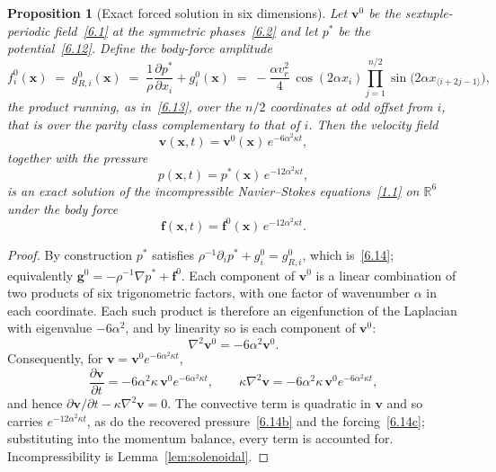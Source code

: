 \documentclass[11pt]{jfm}
\newtheorem{proposition}[lemma]{Proposition}
\numberwithin{equation}{section}
\begin{document}
\begin{proposition}[Exact forced solution in six dimensions]
\label{prop:6D-forced}
Let $\boldsymbol{v}^0$ be the sextuple-periodic field~\eqref{6.1} at the symmetric
phases~\eqref{6.2} and let $p^{*}$ be the potential~\eqref{6.12}. Define the body-force amplitude
\begin{equation}
\label{6.14}
f_i^0(\boldsymbol{x}) \;=\; g_{R,i}^{0}(\boldsymbol{x})
\;=\; \frac{1}{\rho}\frac{\partial p^{*}}{\partial x_i}+ g_i^0(\boldsymbol{x})
\;=\; -\frac{\alpha v_r^2}{4}\,\cos(2\alpha x_i)
\prod_{j=1}^{n/2}\sin\!\bigl(2\alpha x_{\langle i+2j-1\rangle}\bigr),
\end{equation}
the product running, as in~\eqref{6.13}, over the $n/2$ coordinates at odd offset from $i$,
that is over the parity class complementary to that of $i$. Then the velocity field
\begin{equation}
\label{6.14a}
\boldsymbol{v}(\boldsymbol{x},t)=\boldsymbol{v}^0(\boldsymbol{x})\,e^{-6\alpha^2\kappa t},
\end{equation}
together with the pressure
\begin{equation}
\label{6.14b}
p(\boldsymbol{x},t)=p^{*}(\boldsymbol{x})\,e^{-12\alpha^2\kappa t},
\end{equation}
is an exact solution of the incompressible Navier--Stokes equations~\eqref{1.1} on $\mathbb{R}^6$
under the body force
\begin{equation}
\label{6.14c}
\boldsymbol{f}(\boldsymbol{x},t)=\boldsymbol{f}^0(\boldsymbol{x})\,e^{-12\alpha^2\kappa t}.
\end{equation}
\end{proposition}

\begin{proof}
By construction $p^{*}$ satisfies $\rho^{-1}\partial_i p^{*}+ g_i^0= g_{R,i}^{0}$, which
is~\eqref{6.14}; equivalently $\boldsymbol{g}^0=-\rho^{-1}\nabla p^{*}+\boldsymbol{f}^0$. Each
component of $\boldsymbol{v}^0$ is a linear combination of two products of six trigonometric
factors, with one factor of wavenumber $\alpha$ in each coordinate. Each such product is therefore
an eigenfunction of the Laplacian with eigenvalue $-6\alpha^2$, and by linearity so is each
component of $\boldsymbol{v}^0$:
\[
\nabla^2\boldsymbol{v}^0=-6\alpha^2\boldsymbol{v}^0 .
\]
Consequently, for $\boldsymbol{v}=\boldsymbol{v}^0e^{-6\alpha^2\kappa t}$,
\[
\frac{\partial\boldsymbol{v}}{\partial t}=-6\alpha^2\kappa\,\boldsymbol{v}^0e^{-6\alpha^2\kappa t},
\qquad
\kappa\nabla^2\boldsymbol{v}=-6\alpha^2\kappa\,\boldsymbol{v}^0e^{-6\alpha^2\kappa t},
\]
and hence $\partial\boldsymbol{v}/\partial t-\kappa\nabla^2\boldsymbol{v}=0$. The convective term is quadratic in
$\boldsymbol{v}$ and so carries $e^{-12\alpha^2\kappa t}$, as do the recovered
pressure~\eqref{6.14b} and the forcing~\eqref{6.14c}; substituting into the momentum balance,
every term is accounted for. Incompressibility is Lemma~\ref{lem:solenoidal}.
\end{proof}
\end{document}
